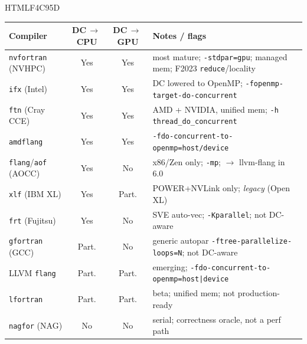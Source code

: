 \definecolor{cWip} {HTML}{F4C95D}
\newcommand{\yes}[1]{\cellcolor{cDone}#1}
\newcommand{\prt}[1]{\cellcolor{cWip}#1}
\newcommand{\nope}[1]{\cellcolor{cTodo}#1}

{\footnotesize
\setlength{\tabcolsep}{4pt}
\renewcommand{\arraystretch}{1.25}
\begin{tabularx}{\textwidth}{@{}l c c >{\raggedright\arraybackslash}X@{}}
\toprule
\textbf{Compiler} & \textbf{DC\,$\to$\,CPU} & \textbf{DC\,$\to$\,GPU} & \textbf{Notes / flags} \\
\midrule
\texttt{nvfortran} (NVHPC)         & \yes{Yes}   & \yes{Yes}   & most mature; \texttt{-stdpar=gpu}; managed mem; F2023 \texttt{reduce}/locality \\
\texttt{ifx} (Intel)               & \yes{Yes}   & \yes{Yes}   & DC lowered to OpenMP; \texttt{-fopenmp-target-do-concurrent} \\
\texttt{ftn} (Cray CCE)            & \yes{Yes}   & \yes{Yes}   & AMD + NVIDIA, unified mem; \texttt{-h thread\_do\_concurrent} \\
\texttt{amdflang} & \yes{Yes}   & \yes{Yes}   & \texttt{-fdo-concurrent-to-openmp=host/device} \\
\texttt{flang}/\texttt{aof} (AOCC) & \yes{Yes}   & \nope{No}   & x86/Zen only; \texttt{-mp}; $\to$ llvm-flang in 6.0 \\
\texttt{xlf} (IBM XL)              & \yes{Yes}   & \prt{Part.} & POWER+NVLink only; \emph{legacy} (Open XL) \\
\texttt{frt} (Fujitsu)             & \yes{Yes}   & \nope{No}   & SVE auto-vec; \texttt{-Kparallel}; not DC-aware \\
\texttt{gfortran} (GCC)            & \prt{Part.} & \nope{No}   & generic autopar \texttt{-ftree-parallelize-loops=N}; not DC-aware \\
LLVM \texttt{flang}                & \prt{Part.} & \prt{Part.} & emerging; \texttt{-fdo-concurrent-to-openmp=host|device} \\
\texttt{lfortran}                  & \prt{Part.} & \prt{Part.} & beta; unified mem; not production-ready \\
\texttt{nagfor} (NAG)              & \nope{No}   & \nope{No}   & serial; correctness oracle, not a perf path \\
\bottomrule
\end{tabularx}}
